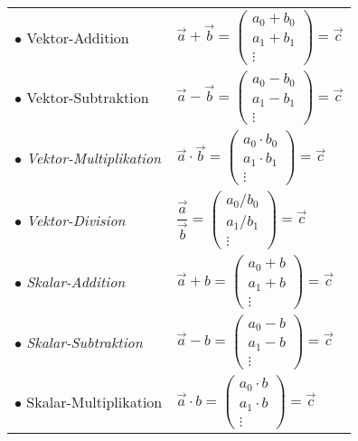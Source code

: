 	\begin{longtable}[l]{ll}
		$\bullet$ Vektor-Addition		& $\overrightarrow{a} + \overrightarrow{b} = \begin{pmatrix} a_{0} + b_{0} \\ a_{1} + b_{1}\\ \vdots  \end{pmatrix} = \overrightarrow{c}$ \\
		$\bullet$ Vektor-Subtraktion	& $\overrightarrow{a} - \overrightarrow{b} = \begin{pmatrix} a_{0} - b_{0} \\ a_{1} - b_{1}\\ \vdots  \end{pmatrix} = \overrightarrow{c}$ \\
		$\bullet$ \textit{Vektor-Multiplikation} & $\overrightarrow{a} \cdot \overrightarrow{b} = \begin{pmatrix} a_{0} \cdot b_{0} \\ a_{1} \cdot b_{1}\\ \vdots  \end{pmatrix} = \overrightarrow{c}$ \\
		$\bullet$ \textit{Vektor-Division} & $\dfrac{\overrightarrow{a}}{\overrightarrow{b}} = \begin{pmatrix} a_{0} / b_{0} \\ a_{1} / b_{1}\\ \vdots  \end{pmatrix} = \overrightarrow{c}$ \\
		$\bullet$ \textit{Skalar-Addition}		& $\overrightarrow{a} + b = \begin{pmatrix} a_{0} + b \\ a_{1} + b\\ \vdots  \end{pmatrix} = \overrightarrow{c}$ \\
		$\bullet$ \textit{Skalar-Subtraktion}	& $\overrightarrow{a} - b = \begin{pmatrix} a_{0} - b \\ a_{1} - b\\ \vdots  \end{pmatrix} = \overrightarrow{c}$ \\
		$\bullet$ Skalar-Multiplikation	& $\overrightarrow{a} \cdot b = \begin{pmatrix} a_{0} \cdot b \\ a_{1} \cdot b\\ \vdots  \end{pmatrix} = \overrightarrow{c}$ \\

\end{longtable}
